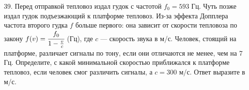39. Перед отправкой тепловоз издал гудок с частотой $f_0=593$ Гц. Чуть позже издал гудок подъезжающий к платформе тепловоз. Из-за эффекта Допплера частота второго гудка $f$ больше первого: она зависит от скорости тепловоза по закону $f(v)=\cfrac{f_0}{1-\frac{v}{c}}$ (Гц), где $c$ --- скорость звука в м/с. Человек, стоящий на платформе, различает сигналы по тону, если они отличаются не менее, чем на 7 Гц. Определите, с какой минимальной скоростью приближался к платформе тепловоз, если человек смог различить сигналы, а $c=300$ м/с. Ответ выразите в м/с.\\
